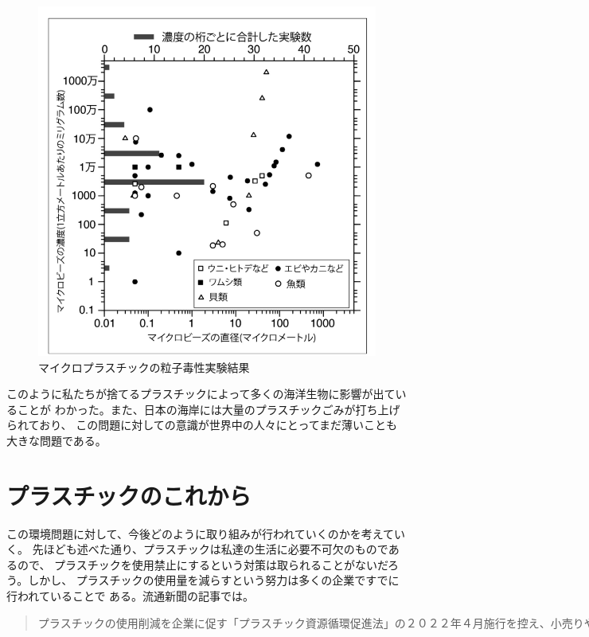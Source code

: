 \documentclass[dvipdfmx,autodetect-engine,titlepage]{jsarticle}
\begin{document}
\begin{figure}[h]
  \centering
  \includegraphics[scale=0.4]{SS1.png}
  \caption{マイクロプラスチックの粒子毒性実験結果}
\end{figure}

このように私たちが捨てるプラスチックによって多くの海洋生物に影響が出ていることが
わかった。また、日本の海岸には大量のプラスチックごみが打ち上げられており、
この問題に対しての意識が世界中の人々にとってまだ薄いことも大きな問題である。

\section{プラスチックのこれから}
この環境問題に対して、今後どのように取り組みが行われていくのかを考えていく。
先ほども述べた通り、プラスチックは私達の生活に必要不可欠のものであるので、
プラスチックを使用禁止にするという対策は取られることがないだろう。しかし、
プラスチックの使用量を減らすという努力は多くの企業ですでに行われていることで
ある。流通新聞の記事では。

\begin{quote}
  \begin{math}
    プラスチックの使用削減を企業に促す「プラスチック資源循環促進法」の２０
    ２２年４月施行を控え、小売りや外食チェーンが対応を急いでいる。ファミリーマ
    ートは柄に穴を空けたスプーンを導入し、スターバックスコーヒージャパンはストローすべて
    を紙製に切り替えた。有料化への動きは鈍いようで、紙や木製への転換などで「減プラ」を
    目指す企業が目立つ。^{(6)}
  \end{math}
\end{quote}
\end{document}
